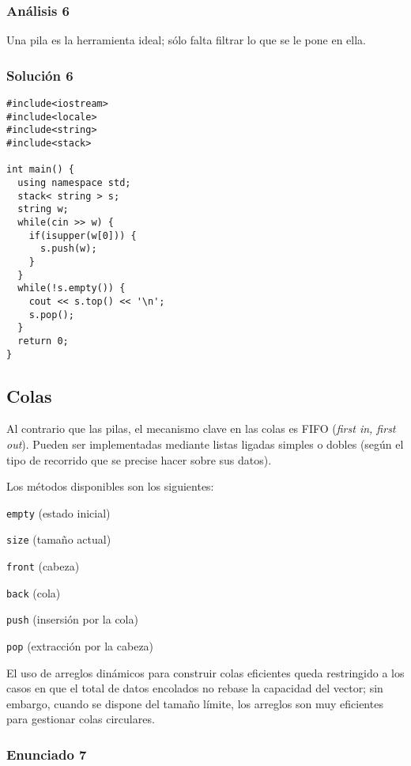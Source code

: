 \documentclass[10pt,letterpaper,twocolumn,spanish]{article}
\begin{document}
\subsubsection*{Análisis 6}

Una pila es la herramienta ideal; sólo falta filtrar lo que se le pone en ella.

\subsubsection*{Solución 6}

\begin{verbatim}
#include<iostream>
#include<locale>
#include<string>
#include<stack>

int main() {
  using namespace std;
  stack< string > s;
  string w;
  while(cin >> w) {
    if(isupper(w[0])) {
      s.push(w);
    }
  }
  while(!s.empty()) {
    cout << s.top() << '\n';
    s.pop();
  }
  return 0;
}
\end{verbatim}

\subsection*{Colas}

Al contrario que las pilas, el mecanismo clave en las colas es FIFO (\textit{first in, first out}). Pueden ser implementadas mediante listas ligadas simples o dobles (según el tipo de recorrido que se precise hacer sobre sus datos).

Los métodos disponibles son los siguientes:

\begin{compactitem}
\item \texttt{empty} (estado inicial)
\item \texttt{size} (tamaño actual)
\item \texttt{front} (cabeza)
\item \texttt{back} (cola)
\item \texttt{push} (insersión por la cola)
\item \texttt{pop} (extracción por la cabeza)
\end{compactitem}

El uso de arreglos dinámicos para construir colas eficientes queda restringido a los casos en que el total de datos encolados no rebase la capacidad del vector; sin embargo, cuando se dispone del tamaño límite, los arreglos son muy eficientes para gestionar colas circulares.

\subsubsection*{Enunciado 7}
\end{document}
